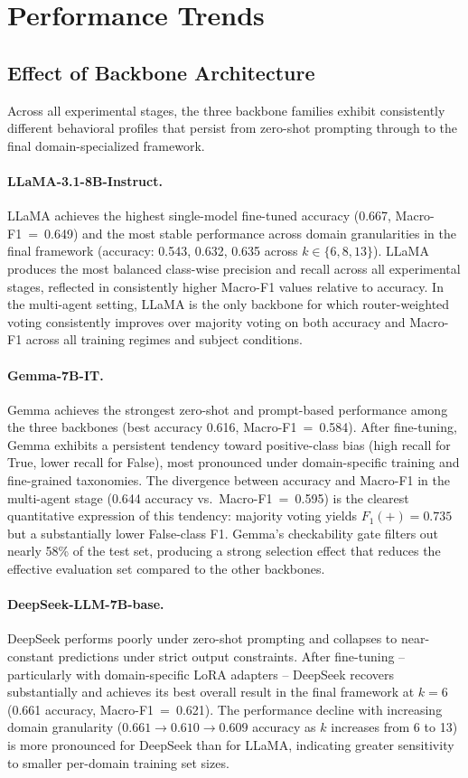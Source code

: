 \section{Performance Trends}

\subsection{Effect of Backbone Architecture}

Across all experimental stages, the three backbone families exhibit consistently different behavioral profiles that persist from zero-shot prompting through to the final domain-specialized framework.

\paragraph{LLaMA-3.1-8B-Instruct.}
LLaMA achieves the highest single-model fine-tuned accuracy (0.667, Macro-F1~=~0.649) and the most stable performance across domain 
granularities in the final framework (accuracy: 0.543, 0.632, 0.635 across $k \in \{6, 8, 13\}$). LLaMA produces the most balanced 
class-wise precision and recall across all experimental stages, reflected in consistently higher Macro-F1 values relative to accuracy. In the multi-agent setting, LLaMA is the only backbone for which router-weighted voting consistently improves over majority voting on both accuracy and Macro-F1 across all training regimes and subject conditions.

\paragraph{Gemma-7B-IT.}
Gemma achieves the strongest zero-shot and prompt-based performance among the three backbones (best accuracy 0.616, Macro-F1~=~0.584). After fine-tuning, Gemma exhibits a persistent tendency toward positive-class bias (high recall for True, lower recall for False), most pronounced under domain-specific training and fine-grained taxonomies. The divergence between accuracy and Macro-F1 in the multi-agent stage (0.644 accuracy vs.\ Macro-F1~=~0.595) is the clearest quantitative expression of this tendency: majority voting yields $F_1(+) = 0.735$ but a substantially lower False-class F1. Gemma's checkability gate filters out nearly 58\% of the test set, producing a strong selection effect that reduces the effective evaluation set compared to the other backbones.

\paragraph{DeepSeek-LLM-7B-base.}
DeepSeek performs poorly under zero-shot prompting and collapses to near-constant predictions under strict output constraints. After 
fine-tuning -- particularly with domain-specific LoRA adapters -- DeepSeek recovers substantially and achieves its best overall result in the final framework at $k{=}6$ (0.661 accuracy, Macro-F1~=~0.621). The performance decline with increasing domain granularity ($0.661 \to 0.610 \to 0.609$ accuracy as $k$ increases from 6 to 13) is more pronounced for DeepSeek than for LLaMA, indicating greater sensitivity to smaller per-domain training set sizes.

